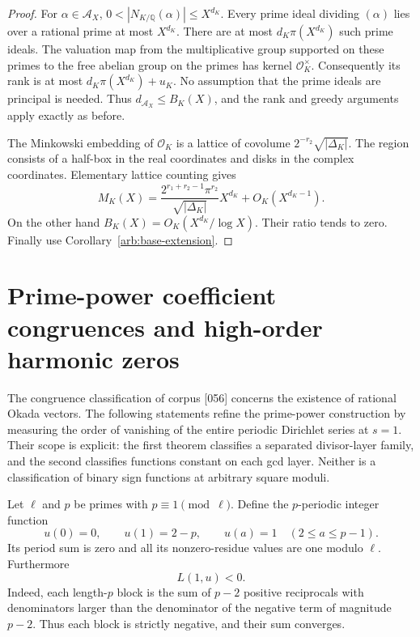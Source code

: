 \documentclass[11pt,a4paper]{article}
\theoremstyle{definition}
\theoremstyle{remark}
\numberwithin{equation}{section}
\begin{document}
\begin{proof}
For \(\alpha\in\mathcal A_X\),
\(0<|N_{K/\mathbb Q}(\alpha)|\leq X^{d_K}\).
Every prime ideal dividing \((\alpha)\) lies over a rational prime
at most \(X^{d_K}\).  There are at most
\(d_K\pi(X^{d_K})\) such prime ideals.  The valuation map from
the multiplicative group supported on these primes to the free
abelian group on the primes has kernel \(\mathcal O_K^\times\).
Consequently its rank is at most
\(d_K\pi(X^{d_K})+u_K\).
No assumption that the prime ideals are principal is needed.
Thus \(d_{\mathcal A_X}\leq B_K(X)\), and the rank and greedy
arguments apply exactly as before.

The Minkowski embedding of \(\mathcal O_K\) is a lattice of
covolume \(2^{-r_2}\sqrt{|\Delta_K|}\).  The region consists of a
half-box in the real coordinates and disks in the complex
coordinates.  Elementary lattice counting gives
\[
 M_K(X)=
 \frac{2^{r_1+r_2-1}\pi^{r_2}}{\sqrt{|\Delta_K|}}X^{d_K}
       +O_K(X^{d_K-1}).
\]
On the other hand \(B_K(X)=O_K(X^{d_K}/\log X)\).
Their ratio tends to zero.  Finally use
Corollary~\ref{arb:base-extension}.
\end{proof}

\section{Prime-power coefficient congruences and high-order harmonic zeros}
\label{arb:primepowers}

The congruence classification of corpus [056] concerns the existence
of rational Okada vectors.  The following statements refine the
prime-power construction by measuring the order of vanishing of the
entire periodic Dirichlet series at \(s=1\).  Their scope is explicit:
the first theorem classifies a separated divisor-layer family, and
the second classifies functions constant on each gcd layer.  Neither
is a classification of binary sign functions at arbitrary square
moduli.

Let \(\ell\) and \(p\) be primes with \(p\equiv1\pmod\ell\).
Define the \(p\)-periodic integer function
\[
 u(0)=0,\qquad u(1)=2-p,\qquad
 u(a)=1\quad(2\leq a\leq p-1).
\]
Its period sum is zero and all its nonzero-residue values are one
modulo \(\ell\).  Furthermore
\begin{equation}\label{arb:unonzero}
 L(1,u)<0.
\end{equation}
Indeed, each length-\(p\) block is the sum of \(p-2\) positive
reciprocals with denominators larger than the denominator of the
negative term of magnitude \(p-2\).  Thus each block is strictly
negative, and their sum converges.
\end{document}
